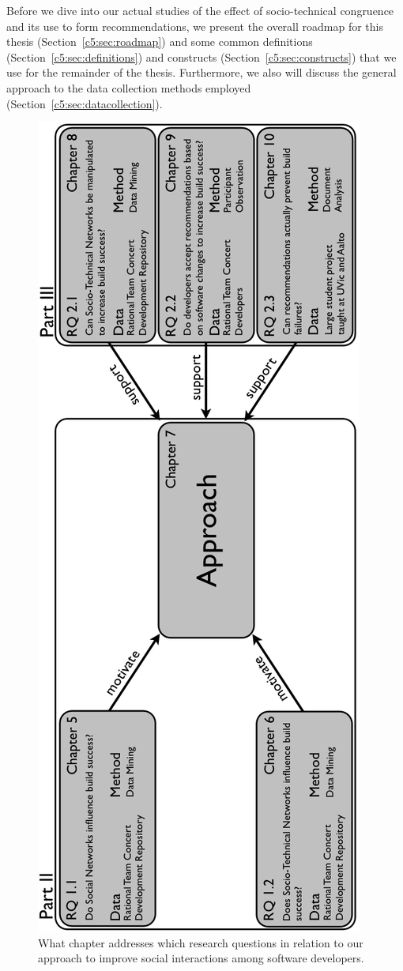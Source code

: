 \label{chap:meth}
Before we dive into our actual studies of the effect of socio-technical congruence and its use to form recommendations, we present the overall roadmap for this thesis (Section~\ref{c5:sec:roadmap}) and some common definitions (Section~\ref{c5:sec:definitions}) and constructs (Section~\ref{c5:sec:constructs}) that we use for the remainder of the thesis.
Furthermore, we also will discuss the general approach to the data collection methods employed (Section~\ref{c5:sec:datacollection}).

\begin{figure}[h!]
\centering
\includegraphics[height=.9\textheight]{./figures/roadmap}
\caption{What chapter addresses which research questions in relation to our approach to improve social interactions among software developers.}
\label{fig:roadmap}
\end{figure}

